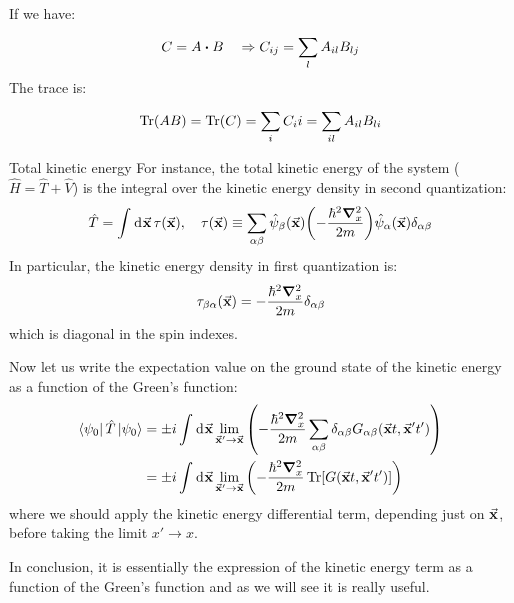 \documentclass[../main/main.tex]{subfiles}
\begin{document}
\begin{remark}
If we have:
\begin{equation*}
  C = A \vdot B \quad \Rightarrow C_{ij} = \sum_{l}^{} A_{il} B_{lj}
\end{equation*}
The trace is:
\begin{equation*}
  \Tr(AB) = \Tr(C) = \sum_{i}^{} C_ii  = \sum_{il}^{} A_{il} B_{li}
\end{equation*}
\end{remark}

\begin{example}{Total kinetic energy}{}
For instance, the total kinetic energy of the system (\( \hat{H} = \hat{T} + \hat{V}    \)) is the integral over the kinetic energy density in second quantization:
\begin{equation*}
  \hat{T} = \int_{}^{} \dd[]{\va{x}} \tau (\va{x}), \quad \tau (\va{x}) \equiv \sum_{\alpha \beta }^{} \hat{\psi }_ \beta (\va{x}) \qty(- \frac{\hbar ^2 \grad _x^2}{2m}) \hat{\psi }_ \alpha (\va{x}) \delta _{\alpha \beta }
\end{equation*}
In particular, the kinetic energy density in first quantization is:
\begin{equation*}
  \tau _{\beta \alpha } (\va{x}) = - \frac{\hbar ^2 \grad _x^2}{2m} \delta _{\alpha \beta }
\end{equation*}
which is diagonal in the spin indexes.

Now let us write the expectation value on the ground state of the kinetic energy as a function of the Green's function:
\begin{equation*}
\begin{split}
\bra{\psi _0} \hat{T} \ket{\psi _0}     &= \pm i \int_{}^{} \dd[]{\va{x}} \lim_{\va{x}' \rightarrow \va{x}}
\qty(- \frac{\hbar ^2 \grad ^2_x}{2m} \sum_{\alpha \beta }^{} \delta _{\alpha \beta } G_{\alpha \beta } (\va{x}t,\va{x}'t')  )      \\
&= \pm i \int_{}^{} \dd[]{\va{x}} \lim_{\va{x}'\rightarrow \va{x}}\qty( - \frac{\hbar ^2 \grad ^2_x}{2m} \Tr[G (\va{x}t,\va{x}'t')] )
\end{split}
\label{eq:7_4}
\end{equation*}
where we should apply the kinetic energy differential term, depending just on \( \va{x} \), before taking the limit \( x' \rightarrow x \).

In conclusion, it is essentially the expression of the kinetic energy term as a function of the Green's function and as we will see it is really useful.
\end{example}
\end{document}
